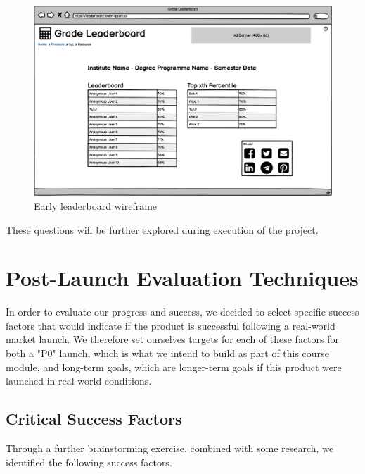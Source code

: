 \begin{figure}[H]
    \centering
    \includegraphics[width=\textwidth]{images/One course - Leaderboard v07.png}
    \caption{Early leaderboard wireframe}
    \label{fig:earlyleaderboardwireframe}
\end{figure}

These questions will be further explored during execution of the project.

\section{Post-Launch Evaluation Techniques}
In order to evaluate our progress and success, we decided to select specific success factors that would indicate if the product is successful following a real-world market launch. We therefore set ourselves targets for each of these factors for both a "P0" launch, which is what we intend to build as part of this course module, and long-term goals, which are longer-term goals if this product were launched in real-world conditions.

\subsection{Critical Success Factors}
Through a further brainstorming exercise, combined with some research, we identified the following success factors.

